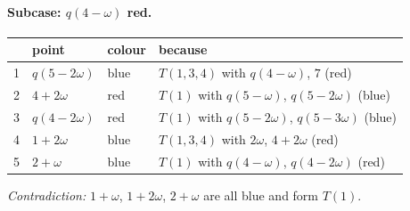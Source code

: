 \paragraph{Subcase: $q(4-\omega)$ red.}
\begin{center}\small\begin{longtable}{rlll}\toprule & point & colour & because\\\midrule\endhead
1 & $q(5-2\omega)$ & blue & $T(1,3,4)$ with $q(4-\omega)$, $7$ (red)\\
2 & $4+2\omega$ & red & $T(1)$ with $q(5-\omega)$, $q(5-2\omega)$ (blue)\\
3 & $q(4-2\omega)$ & red & $T(1)$ with $q(5-2\omega)$, $q(5-3\omega)$ (blue)\\
4 & $1+2\omega$ & blue & $T(1,3,4)$ with $2\omega$, $4+2\omega$ (red)\\
5 & $2+\omega$ & blue & $T(1)$ with $q(4-\omega)$, $q(4-2\omega)$ (red)\\
\bottomrule\end{longtable}\end{center}
\noindent\emph{Contradiction:} $1+\omega$, $1+2\omega$, $2+\omega$ are all blue and form $T(1)$.\par\medskip
